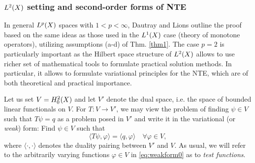 \subsubsection{$\Lp[2](X)$ setting and second-order forms of NTE}\label{sec:L2}
In general $\Lp(X)$ spaces with $1 < p < \infty$, Dautray and Lions outline the proof based on the same ideas as those
used in the $\Lp[1](X)$ case (theory of monotone operators), utilizing assumptions (a-d) of Thm. \ref{thm1}.  The case
$p = 2$ is particularly important
as the Hilbert space structure of $\Lp[2](X)$ allows to use richer set of mathematical tools to
formulate practical solution methods. In particular, it allows to formulate variational principles for the NTE, which
are of both theoretical and practical importance. 

Let us set $V = \Hpnot[2](X)$ and let $V'$
denote the dual space, i.e.
the space of bounded linear functionals on $V$.  For $T : V \to V'$, we may view the problem of
finding $\psi \in V$ such that $T\psi = q$
as a problem posed in $V'$ and write it in the variational (or \textit{weak}) form: Find $\psi \in V$ such that 
\begin{equation}\label{eq:weakform0}
	\langle T\psi, \varphi \rangle = \langle q, \varphi \rangle  \quad \forall \varphi\in V,
\end{equation}
where $\langle \cdot,\cdot\rangle$ denotes the duality pairing between $V'$ and $V$. As usual, we will refer to the
arbitrarily varying functions $\varphi\in V$ in \eqref{eq:weakform0} as to \textit{test functions}.

